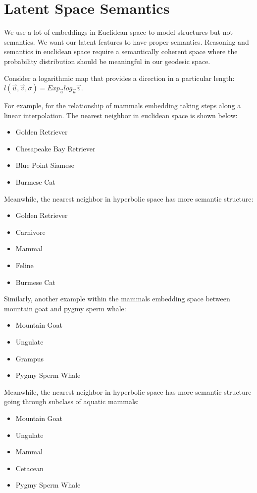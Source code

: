 \section{Latent Space Semantics}

We use a lot of embeddings in Euclidean space to model structures but not semantics. We want our latent features to have proper semantics. Reasoning and semantics in euclidean space require a semantically coherent space where the probability distribution should be meaningful in our geodesic space.  

 Consider a logarithmic map that provides a direction in a particular length:
 $l(\vec{u},\vec{v},\sigma)= Exp_{\vec{u}} log_{\vec{u}}\vec{v}$.
 
 For example, for the relationship of mammals embedding taking steps along a linear interpolation. The nearest neighbor in euclidean space is shown below:
\begin{itemize}
    \item Golden Retriever
    \item Chesapeake Bay Retriever
    \item Blue Point Siamese
    \item Burmese Cat
\end{itemize}

Meanwhile, the nearest neighbor in hyperbolic space has more semantic structure:
\begin{itemize}
    \item Golden Retriever
    \item Carnivore
    \item Mammal
    \item Feline
    \item Burmese Cat
\end{itemize}

Similarly, another example within the mammals embedding space between mountain goat and pygmy sperm whale:
\begin{itemize}
    \item Mountain Goat
    \item Ungulate
    \item Grampus
    \item Pygmy Sperm Whale
\end{itemize}

Meanwhile, the nearest neighbor in hyperbolic space has more semantic structure going through subclass of aquatic mammals:
\begin{itemize}
    \item Mountain Goat
    \item Ungulate
    \item Mammal
    \item Cetacean
    \item Pygmy Sperm Whale
\end{itemize}

